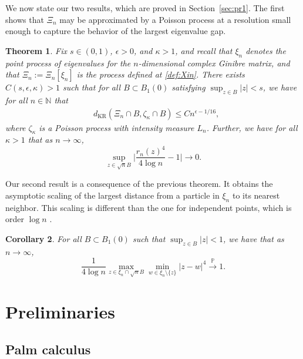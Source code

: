 \documentclass{amsart}
\theoremstyle{plain}
\newtheorem{theorem}{Theorem}
\newtheorem{corollary}[theorem]{Corollary}
\theoremstyle{definition}
\theoremstyle{remark}
\def\P{\mathbb P}
\begin{document}
We now state our two results, which are proved in Section~\ref{sec:pr1}. The first shows that $\Xi_{n}$ may be approximated by a Poisson process at a resolution small enough to capture the behavior of the largest eigenvalue gap. 
\begin{theorem} \label{th}
	Fix  $s \in (0,1)$, $\epsilon >0$, and $\kappa>1$, and recall that $\xi_n$ denotes the point process of eigenvalues for the $n$-dimensional complex Ginibre matrix, and that $\Xi_{n}:=\Xi_{n}[\xi_n]$ is the process defined at \eqref{def:Xin}.   
There exists $C(s, \epsilon, \kappa)>1$ such that for all $B \subset B_1(0)$ satisfying $\sup_{z \in B} | z |  <s$, we have  for all  $n \in \mathbb{N}$ that 
	\begin{align}\label{e:KRthm}
		&{d_{\mathrm{KR}}}(\Xi_{n} \cap B,\zeta_\kappa \cap B) \le C n^{\epsilon-1/16},
	\end{align}
where $\zeta_\kappa$ is a Poisson process with intensity measure $L_n$.
Further,  we have for all $\kappa>1 $ that as $n \to \infty$,
\begin{equation}\label{e:rcnlimit}
\sup_{z \in \sqrt n B} \Big|\frac{r_{n}(z)^4}{4 \log n} -1\Big| \to 0.
\end{equation}
\end{theorem}

Our second result is a consequence of the previous theorem. It obtains the asymptotic scaling of the largest distance from a particle  in $ \xi_n$ to its nearest neighbor. This scaling is different than the one for independent points, which is order $\log n$ \cite{cho}. 

\begin{corollary}
	\label{cor:maxdistance}
	For all $B \subset B_1(0)$ such that $\sup_{ z \in B} | z | <1$, we have that as $n \to \infty$,
	$$
	\frac{1}{4 \log n} \max_{z \in \xi_n \cap \sqrt nB} \min_{w \in \xi_n \setminus \{z\}} | z-w|^4 \stackrel{\P}{\longrightarrow} 1.
	$$
\end{corollary}



\section{Preliminaries} \label{sec:prelim}
\subsection{Palm calculus}
\end{document}
